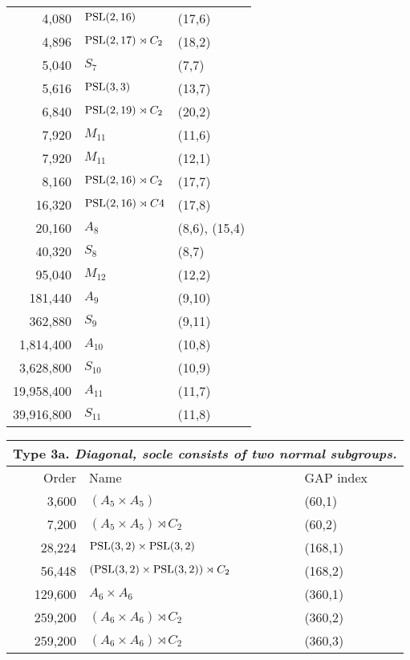 {\begin{tabular}{r|l|l}
 4,080 & $\mathrm{PSL}(2,16)$ & (17,6) \\
 4,896 & $\mathrm{PSL}(2,17) \rtimes C_2$ & (18,2) \\
 5,040 & $S_7$ & (7,7) \\
 5,616 & $\mathrm{PSL}(3,3)$ & (13,7) \\
 6,840 & $\mathrm{PSL}(2,19) \rtimes C_2$ & (20,2) \\
 7,920 & $M_{11}$ & (11,6) \\
 7,920 & $M_{11}$ & (12,1) \\
 8,160 & $\mathrm{PSL}(2,16) \rtimes C_2$ & (17,7) \\
 16,320 & $\mathrm{PSL}(2,16) \rtimes C4$ & (17,8)\\
 20,160 & $A_8$ & (8,6), (15,4)  \\
 40,320 & $S_8$ & (8,7) \\
 95,040 & $M_{12}$ & (12,2) \\
 181,440 & $A_9$ & (9,10) \\
 362,880 & $S_9$ & (9,11) \\
 1,814,400 & $A_{10}$ & (10,8) \\
 3,628,800 & $S_{10}$ & (10,9) \\
 19,958,400 & $A_{11}$ & (11,7) \\
 39,916,800 & $S_{11}$ & (11,8)\\
\end{tabular}




  \begin{tabular}{r|l|l}
  \multicolumn{3}{c}{Type 3a. \emph{Diagonal, socle consists of two normal subgroups.}}\\\toprule
    Order & Name & GAP index \\
\midrule
 3,600 & $(A_5 \times A_5)$ &(60,1) \\
 7,200 & $(A_5 \times A_5) \rtimes C_2$ & (60,2) \\
 28,224 & $\mathrm{PSL}(3,2) \times \mathrm{PSL}(3,2)$ & (168,1) \\
 56,448 & $(\mathrm{PSL}(3,2) \times \mathrm{PSL}(3,2)) \rtimes C_2$ & (168,2) \\
 129,600 & $A_6 \times A_6$ & (360,1) \\
 259,200 & $(A_6 \times A_6) \rtimes C_2$ & (360,2) \\
 259,200 & $(A_6 \times A_6) \rtimes C_2$ & (360,3)\\
\end{tabular}

}
